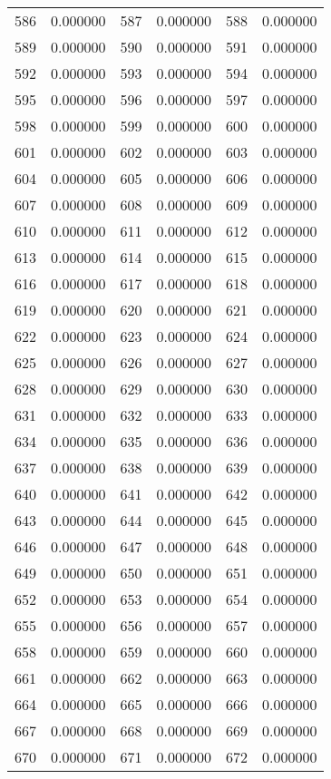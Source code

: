 \documentclass[12pt]{article}
\begin{document}
\begin{longtable}{@{}cc|cc|cc@{}}
586 & 0.000000 & 587 & 0.000000 & 588 & 0.000000 \\
589 & 0.000000 & 590 & 0.000000 & 591 & 0.000000 \\
592 & 0.000000 & 593 & 0.000000 & 594 & 0.000000 \\
595 & 0.000000 & 596 & 0.000000 & 597 & 0.000000 \\
598 & 0.000000 & 599 & 0.000000 & 600 & 0.000000 \\
601 & 0.000000 & 602 & 0.000000 & 603 & 0.000000 \\
604 & 0.000000 & 605 & 0.000000 & 606 & 0.000000 \\
607 & 0.000000 & 608 & 0.000000 & 609 & 0.000000 \\
610 & 0.000000 & 611 & 0.000000 & 612 & 0.000000 \\
613 & 0.000000 & 614 & 0.000000 & 615 & 0.000000 \\
616 & 0.000000 & 617 & 0.000000 & 618 & 0.000000 \\
619 & 0.000000 & 620 & 0.000000 & 621 & 0.000000 \\
622 & 0.000000 & 623 & 0.000000 & 624 & 0.000000 \\
625 & 0.000000 & 626 & 0.000000 & 627 & 0.000000 \\
628 & 0.000000 & 629 & 0.000000 & 630 & 0.000000 \\
631 & 0.000000 & 632 & 0.000000 & 633 & 0.000000 \\
634 & 0.000000 & 635 & 0.000000 & 636 & 0.000000 \\
637 & 0.000000 & 638 & 0.000000 & 639 & 0.000000 \\
640 & 0.000000 & 641 & 0.000000 & 642 & 0.000000 \\
643 & 0.000000 & 644 & 0.000000 & 645 & 0.000000 \\
646 & 0.000000 & 647 & 0.000000 & 648 & 0.000000 \\
649 & 0.000000 & 650 & 0.000000 & 651 & 0.000000 \\
652 & 0.000000 & 653 & 0.000000 & 654 & 0.000000 \\
655 & 0.000000 & 656 & 0.000000 & 657 & 0.000000 \\
658 & 0.000000 & 659 & 0.000000 & 660 & 0.000000 \\
661 & 0.000000 & 662 & 0.000000 & 663 & 0.000000 \\
664 & 0.000000 & 665 & 0.000000 & 666 & 0.000000 \\
667 & 0.000000 & 668 & 0.000000 & 669 & 0.000000 \\
670 & 0.000000 & 671 & 0.000000 & 672 & 0.000000 \\

\end{longtable}
\end{document}
